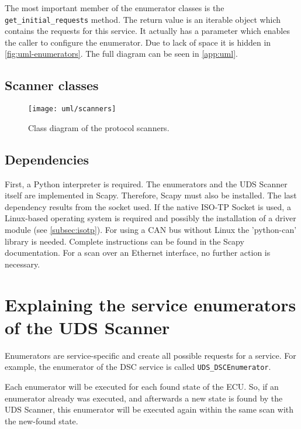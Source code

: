 The most important member of the enumerator classes is the \texttt{get_initial_requests} method. The return value is an iterable object which contains the requests for this service. It actually has a parameter which enables the caller to configure the enumerator. Due to lack of space it is hidden in \autoref{fig:uml-enumerators}. The full diagram can be seen in \autoref{app:uml}.


\subsection{Scanner classes}

\begin{figure}[htb]
    \centering
    \texttt{[image: uml/scanners]}
    \caption{Class diagram of the protocol scanners.}
    \label{fig:uml-scanners}
\end{figure}

\subsection{Dependencies}

First, a Python interpreter is required.
The enumerators and the UDS Scanner itself are implemented in Scapy. Therefore, Scapy must also be installed. The last dependency results from the socket used. If the native ISO-TP Socket is used, a Linux-based operating system is required and possibly the installation of a driver module (see \autoref{subsec:isotp}). For using a CAN bus without Linux the 'python-can' library is needed. Complete instructions can be found in the Scapy documentation. For a scan over an Ethernet interface, no further action is necessary.

\section{Explaining the service enumerators of the UDS Scanner}
\label{sec:enumerators}

Enumerators are service-specific and create all possible requests for a service.
For example, the enumerator of the DSC service is called \texttt{UDS_DSCEnumerator}.

Each enumerator will be executed for each found state of the ECU. So, if an enumerator already was executed, and afterwards a new state is found by the UDS Scanner, this enumerator will be executed again within the same scan with the new-found state.

